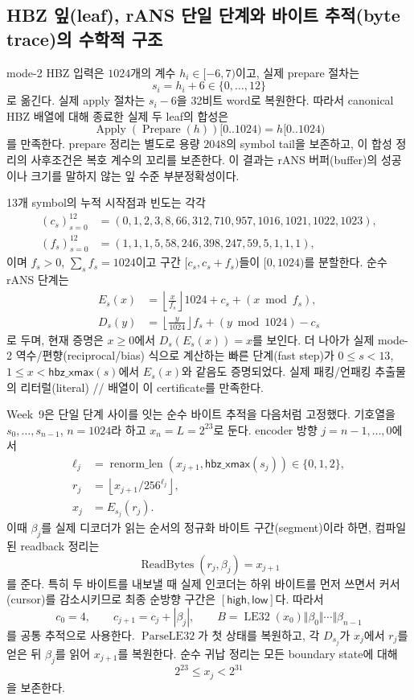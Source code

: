 \subsection{HBZ 잎(leaf), rANS 단일 단계와 바이트 추적(byte trace)의 수학적 구조}

mode-2 HBZ 입력은 \(1024\)개의 계수 \(h_i\in[-6,7)\)이고, 실제 prepare
절차는
\[
  s_i=h_i+6\in\{0,\ldots,12\}
\]
로 옮긴다. 실제 apply 절차는 \(s_i-6\)을 32비트 word로 복원한다. 따라서
canonical HBZ 배열에 대해 종료한 실제 두 leaf의 합성은
\[
  \operatorname{Apply}(\operatorname{Prepare}(h))[0..1024)=h[0..1024)
\]
를 만족한다. prepare 정리는 별도로 용량 \(2048\)의 symbol tail을 보존하고,
이 합성 정리의 사후조건은 복호 계수의 꼬리를 보존한다. 이 결과는 rANS
버퍼(buffer)의 성공이나 크기를 말하지 않는 잎 수준 부분정확성이다.

13개 symbol의 누적 시작점과 빈도는 각각
\[
\begin{aligned}
(c_s)_{s=0}^{12}
  &=(0,1,2,3,8,66,312,710,957,1016,1021,1022,1023),\\
(f_s)_{s=0}^{12}
  &=(1,1,1,5,58,246,398,247,59,5,1,1,1),
\end{aligned}
\]
이며 \(f_s>0\), \(\sum_s f_s=1024\)이고 구간
\([c_s,c_s+f_s)\)들이 \([0,1024)\)를 분할한다. 순수 rANS 단계는
\[
\begin{aligned}
  E_s(x)&=\left\lfloor\frac{x}{f_s}\right\rfloor 1024
           +c_s+(x\bmod f_s),\\
  D_s(y)&=\left\lfloor\frac{y}{1024}\right\rfloor f_s
           +(y\bmod 1024)-c_s
\end{aligned}
\]
로 두며, 현재 증명은 \(x\ge0\)에서 \(D_s(E_s(x))=x\)를 보인다. 더 나아가
실제 mode-2 역수/편향(reciprocal/bias) 식으로 계산하는 빠른 단계(fast step)가
\(0\le s<13\), \(1\le x<\mathsf{hbz\_xmax}(s)\)에서 \(E_s(x)\)와 같음도
증명되었다. 실제 패킹/언패킹 추출물의 리터럴(literal)
// 배열이
이 certificate를 만족한다.

Week~9은 단일 단계 사이를 잇는 순수 바이트 추적을 다음처럼 고정했다. 기호열을
\(s_0,\ldots,s_{n-1}\), \(n=1024\)라 하고 \(x_n=L=2^{23}\)로 둔다. encoder
방향 \(j=n-1,\ldots,0\)에서
\[
\begin{aligned}
  \ell_j&=\operatorname{renorm\_len}
      (x_{j+1},\mathsf{hbz\_xmax}(s_j))\in\{0,1,2\},\\
  r_j&=\left\lfloor x_{j+1}/256^{\ell_j}\right\rfloor,\\
  x_j&=E_{s_j}(r_j).
\end{aligned}
\]
이때 \(\beta_j\)를 실제 디코더가 읽는 순서의 정규화 바이트 구간(segment)이라
하면, 컴파일된 readback 정리는
\[
  \operatorname{ReadBytes}(r_j,\beta_j)=x_{j+1}
\]
를 준다. 특히 두 바이트를 내보낼 때 실제 인코더는 하위 바이트를 먼저 쓰면서
커서(cursor)를 감소시키므로 최종 순방향 구간은
\([\mathsf{high},\mathsf{low}]\)다.
따라서
\[
  c_0=4,\qquad c_{j+1}=c_j+|\beta_j|,
  \qquad
  B=\operatorname{LE32}(x_0)\Vert\beta_0\Vert\cdots\Vert\beta_{n-1}
\]
를 공통 추적으로 사용한다. \(\operatorname{ParseLE32}\)가 첫 상태를 복원하고,
각 \(D_{s_j}\)가 \(x_j\)에서 \(r_j\)를 얻은 뒤 \(\beta_j\)를 읽어
\(x_{j+1}\)를 복원한다. 순수 귀납 정리는 모든 boundary state에 대해
\[
  2^{23}\le x_j<2^{31}
\]
을 보존한다.

